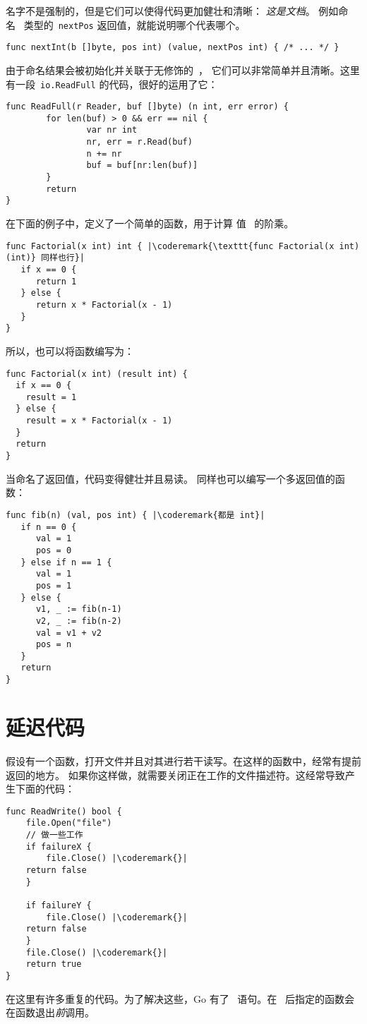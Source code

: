 名字不是强制的，但是它们可以使得代码更加健壮和清晰：
\emph{这是文档}。
例如命名~ 类型的~\lstinline{nextPos} 返回值，就能说明哪个代表哪个。
\begin{lstlisting}
func nextInt(b []byte, pos int) (value, nextPos int) { /* ... */ }
\end{lstlisting}

由于命名结果会被初始化并关联于无修饰的~，
它们可以非常简单并且清晰。这里有一段~\lstinline{io.ReadFull} 的代码，很好的运用了它：

\begin{lstlisting}
func ReadFull(r Reader, buf []byte) (n int, err error) {
        for len(buf) > 0 && err == nil {
                var nr int
                nr, err = r.Read(buf)
                n += nr
                buf = buf[nr:len(buf)]
        }
        return
}
\end{lstlisting}

在下面的例子中，定义了一个简单的函数，用于计算
值~ 的阶乘。
\begin{lstlisting}
func Factorial(x int) int { |\coderemark{\texttt{func Factorial(x int) (int)} 同样也行}|
   if x == 0 {
      return 1
   } else {
      return x * Factorial(x - 1)
   }
}
\end{lstlisting}
所以，也可以将函数编写为：
\begin{lstlisting}
func Factorial(x int) (result int) {
  if x == 0 {
    result = 1	
  } else {
    result = x * Factorial(x - 1)
  }
  return
}
\end{lstlisting}
当命名了返回值，代码变得健壮并且易读。
同样也可以编写一个多返回值的函数：
\begin{lstlisting}
func fib(n) (val, pos int) { |\coderemark{都是 int}|
   if n == 0 {
      val = 1
      pos = 0
   } else if n == 1 {
      val = 1
      pos = 1
   } else {
      v1, _ := fib(n-1)
      v2, _ := fib(n-2)
      val = v1 + v2
      pos = n
   }
   return
}
\end{lstlisting}

\section{延迟代码}
\label{sec:deferred code}
假设有一个函数，打开文件并且对其进行若干读写。在这样的函数中，经常有提前返回的地方。
如果你这样做，就需要关闭正在工作的文件描述符。这经常导致产生下面的代码：
\begin{lstlisting}[caption=没有 defer]
func ReadWrite() bool {
    file.Open("file")
    // 做一些工作
    if failureX {
        file.Close() |\coderemark{}|
	return false
    }

    if failureY {
        file.Close() |\coderemark{}|
	return false
    }
    file.Close() |\coderemark{}|
    return true
}
\end{lstlisting}
在这里有许多重复的代码。为了解决这些，Go 有了~ 
语句。在~ 后指定的函数会在函数退出\emph{前}调用。

